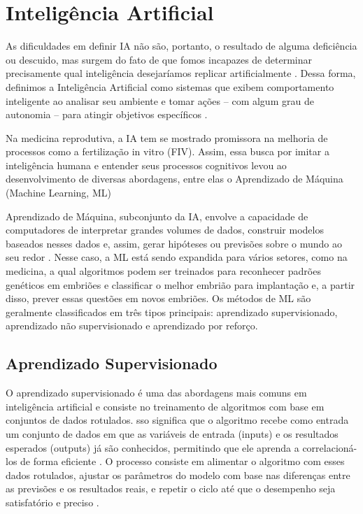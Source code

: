 \section{Inteligência Artificial}

As dificuldades em definir IA não são, portanto, o resultado de alguma deficiência ou descuido, mas surgem do fato de que fomos incapazes de determinar precisamente qual inteligência desejaríamos replicar artificialmente \cite{sheikh2023}. Dessa forma, definimos a Inteligência Artificial como sistemas que exibem comportamento inteligente ao analisar seu ambiente e tomar ações {–} com algum grau de autonomia {–} para atingir objetivos específicos \cite{sheikh2023}.

Na medicina reprodutiva, a IA tem se mostrado promissora na melhoria de processos como a fertilização in vitro (FIV). Assim, essa busca por imitar a inteligência humana e entender seus processos cognitivos levou ao desenvolvimento de diversas abordagens, entre elas o Aprendizado de Máquina (Machine Learning, ML)

Aprendizado de Máquina, subconjunto da IA,  envolve a capacidade de computadores de interpretar grandes volumes de dados, construir modelos baseados nesses dados e, assim, gerar hipóteses ou previsões sobre o mundo ao seu redor \cite{russell2016}. Nesse caso, a ML está sendo expandida para vários setores, como na medicina, a qual algoritmos podem ser treinados para reconhecer padrões genéticos em embriões e classificar o melhor embrião para implantação e, a partir disso, prever essas questões em novos embriões. Os métodos de ML são geralmente classificados em três tipos principais: aprendizado supervisionado, aprendizado não supervisionado e aprendizado por reforço.

\subsection{Aprendizado Supervisionado}

O aprendizado supervisionado é uma das abordagens mais comuns em inteligência artificial e consiste no treinamento de algoritmos com base em conjuntos de dados rotulados. sso significa que o algoritmo recebe como entrada um conjunto de dados em que as variáveis de entrada (inputs) e os resultados esperados (outputs) já são conhecidos, permitindo que ele aprenda a correlacioná-los de forma eficiente \cite{russell2016}. O processo consiste em alimentar o algoritmo com esses dados rotulados, ajustar os parâmetros do modelo com base nas diferenças entre as previsões e os resultados reais, e repetir o ciclo até que o desempenho seja satisfatório e preciso \cite{trask2019}. 

